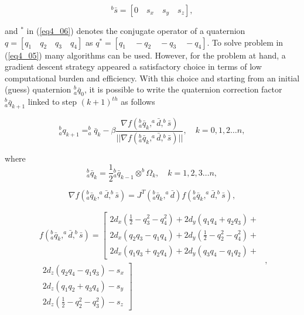 \begin{equation}
\label{eq4_09}
^b \bar{s} = [0 \quad s_x \quad s_y \quad s_z],
\end{equation}

\noindent and $^{*}$ in (\ref{eq4_06}) denotes the conjugate operator of a quaternion $q = [q_1 \quad q_2 \quad q_3 \quad q_4]$ as $q^* = [q_1 \quad -q_2 \quad -q_3 \quad -q_4]$. To solve problem in (\ref{eq4_05}) many algorithms can be used. However, for the problem at hand, a gradient descent strategy appeared a satisfactory choice in terms of low computational burden and efficiency. With this choice and starting from an initial (guess) quaternion $^b_a \bar{q}_0$, it is possible to write the quaternion correction factor $^b_a \bar{q}_{k+1}$ linked to step $(k+1)^{th}$ as follows

\begin{equation}
\label{eq4_10}
^b_a q_{k+1} = ^b_a \bar{q}_k - \beta \frac{\nabla f(^b_a \bar{q}_k, ^a \bar{d}, ^b \bar{s})}{\vert \vert \nabla f(^b_a \bar{q}_k, ^a \bar{d}, ^b \bar{s}) \vert \vert}, \quad k = 0,1,2 \dots n,
\end{equation}

\noindent where
\begin{equation}
\label{eq4_10bis}
^b_a \bar{q}_k = \frac{1}{2} {^b_a \bar{q}_{k-1}} \otimes ^b{\Omega_k},  \quad k = 1,2,3 \dots n,
\end{equation}

\begin{equation}
\label{eq4_11}
\nabla f(^b_a \bar{q}_k, ^a \bar{d}, ^b \bar{s}) = J^T(^b_a \bar{q}_k,^a \bar{d}) f(^b_a \bar{q}_k, ^a \bar{d}, ^b \bar{s}),
\end{equation}

\begin{equation}
\label{eq4_12}
\begin{split}
f(^b_a \bar{q}_k, ^a \bar{d}, ^b \bar{s}) =
\left [ \begin{array}{c}
2d_x(\frac{1}{2} - q_3^2 - q_4^2) + 2d_y(q_1q_4 + q_2 q_3) + \\
2d_x(q_2 q_3 - q_1 q_4) + 2d_y(\frac{1}{2} - q_2^2 - q_4^2) + \\
2d_x(q_1 q_3 + q_2 q_4) + 2d_y(q_3 q_4 - q_1 q_2) + \end{array} \right. \\
\left. \begin{array}{r}
2 d_z(q_2q_4 - q_1q_3) - s_x \\
2d_z(q_1q_2 + q_3 q_4) - s_y \\
2d_z(\frac{1}{2} - q_2^2 - q_3^2) - s_z
\end{array} \right ] \end{split},
\end{equation}

